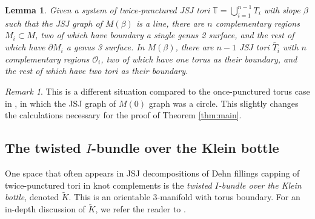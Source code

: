 \documentclass{article}
\theoremstyle{plain}
\theoremstyle{definition}
\theoremstyle{plain}
\theoremstyle{plain}
\theoremstyle{plain}
\newtheorem{lemma}[theorem]{Lemma}
\theoremstyle{remark}
\newtheorem{remark}[theorem]{Remark}
\theoremstyle{remark}
\theoremstyle{plain}
\theoremstyle{plain}
\begin{document}
\begin{lemma}\label{lma:jsjstructure}
Given a system of twice-punctured JSJ tori $\mathbb{T} = \bigcup_{i=1}^{n-1}T_i$ with slope $\beta$ such that the JSJ graph of $M(\beta)$ is a line, there are $n$ complementary regions $M_i \subset M$, two of which have boundary a single genus 2 surface, and the rest of which have $\partial M_i$ a genus 3 surface. In $M(\beta)$, there are $n - 1$ JSJ tori $\widetilde{T_i}$ with $n$ complementary regions $\mathcal{O}_i$, two of which have one torus as their boundary, and the rest of which have two tori as their boundary. 
\end{lemma}

\begin{remark}
This is a different situation compared to the once-punctured torus case in \cite{Wang}, in which the JSJ graph of $M(0)$ graph was a circle. This slightly changes the calculations necessary for the proof of Theorem \ref{thm:main}.
\end{remark}

\subsection{The twisted $I$-bundle over the Klein bottle}

One space that often appears in JSJ decompositions of Dehn fillings capping of twice-punctured tori in knot complements is the \emph{twisted $I$-bundle over the Klein bottle}, denoted $\tilde{K}$. This is an orientable 3-manifold with torus boundary. For an in-depth discussion of $\tilde{K}$, we refer the reader to \cite{LidmanWatson}. 

\medskip
\end{document}
